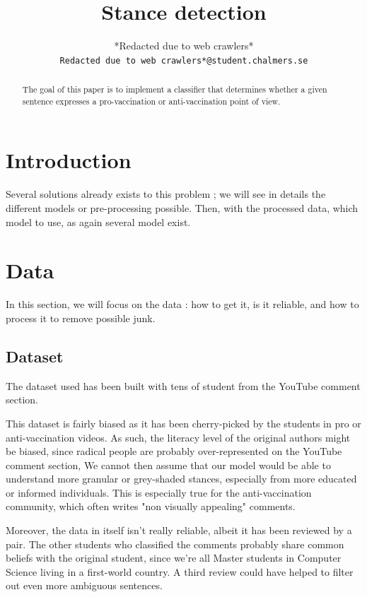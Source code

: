 \documentclass[11pt]{article}
\title{Stance detection}
\author{*Redacted due to web crawlers* \\
  {\tt *Redacted due to web crawlers*@student.chalmers.se}
}
\date{}
\begin{document}
\maketitle
\begin{abstract}
The goal of this paper is to implement a classifier that determines whether a given sentence
expresses a pro-vaccination or anti-vaccination point of view.
\end{abstract}

\section{Introduction}

Several solutions already exists to this problem ;
we will see in details the different models or pre-processing possible.
Then, with the processed data, which model to use, as again several model exist.

\section{Data}

In this section, we will focus on the data : how to get it, is it reliable,
and how to process it to remove possible junk.

\subsection{Dataset}

The dataset used has been built with tens of student from the YouTube comment section.

This dataset is fairly biased as it has been cherry-picked by the students in pro or anti-vaccination videos.
As such, the literacy level of the original authors might be biased,
since radical people are probably over-represented on the YouTube comment section,
We cannot then assume that our model would be able to understand more granular or grey-shaded stances,
especially from more educated or informed individuals.
This is especially true for the anti-vaccination community, which often writes "non visually appealing" comments.

Moreover, the data in itself isn't really reliable, albeit it has been reviewed by a pair.
The other students who classified the comments probably share common beliefs with the original student,
since we're all Master students in Computer Science living in a first-world  country.
A third review could have helped to filter out even more ambiguous sentences.
\end{document}
